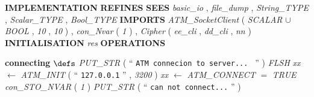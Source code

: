 %
\bsetindent
\begin{tabbing}
\bSetTabs
%
%
\bbnl
{\bf IMPLEMENTATION} \bhsp{} \-\label{ATMI}
%
%
\bbnl
{\bf REFINES} \label{ATM}
%
%
\bbnl
{\bf SEES} \+ \bbnl
{\em basic\_io\/}\label{basic_io}  , \bnl
{\em file\_dump\/}\label{file_dump}  , \bnl
{\em String\_TYPE\/}\label{String_TYPE}  , \bnl
{\em Scalar\_TYPE\/}\label{Scalar_TYPE}  , \bnl
{\em Bool\_TYPE\/}\label{Bool_TYPE}  \-
%
%
\bbnl
{\bf IMPORTS} \+ \bbnl
{\em ATM\_SocketClient\/}\label{ATM_SocketClient}  ( {\em SCALAR\/}\label{SCALAR}  $\cup$ {\em BOOL\/}\label{BOOL}  , {\em 10\/} , {\em 10\/} )  , \bnl
{\em con\_Nvar\/}\label{con_Nvar}  ( {\em 1\/} )  , \bnl
{\em Cipher\/}\label{Cipher}  ( {\em ee\_cli\/}\label{ee_cli}  , {\em dd\_cli\/}\label{dd_cli}  , {\em nn\/}\label{nn}  )  \-
%
%
\bbnl
{\bf INITIALISATION} \+ \bbnl
{\em res\/} \-
%
%
\bnl\bnl
{\bf OPERATIONS} \+ \bbnl

%
%
{\bf { connecting}}  \bhsp $\defs$ \+ \bnl
  \+\bnl
{}  \- \bhsp {} \+\bnl
{\em PUT\_STR\/}\label{PUT_STR}  (  `` {\tt ATM connecion to server...
} ''  )  \bStatementSemiColon \bnl
{\em FLSH\/}\label{FLSH}  \bStatementSemiColon \bnl
{\em xx\/} $\longleftarrow$ {\em ATM\_INIT\/}\label{ATM_INIT}  (  `` {\tt 127.0.0.1} ''  , {\em 3200\/} )  \bStatementSemiColon \bnl
{\em xx\/} $\longleftarrow$ {\em ATM\_CONNECT\/}\label{ATM_CONNECT}  \bStatementSemiColon \bnl
{}  $=$ {\em TRUE\/} \- \bhsp {} \+\bnl
{\em con\_STO\_NVAR\/}\label{con_STO_NVAR}  ( {\em 1\/} )  \-\bnl
{} \+\bnl
{\em PUT\_STR\/}\label{PUT_STR}  (  `` {\tt can not connect...} ''  )  \-\bnl
{}  \-\bnl
{}  \-\bnl
{}  \- \bOperationSemiColon 
\end{tabbing}
